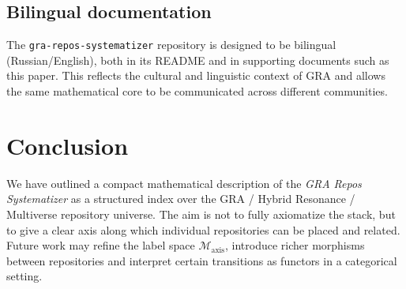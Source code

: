 \documentclass[11pt,a4paper]{article}
\begin{document}
\subsection{Bilingual documentation}

The \texttt{gra-repos-systematizer} repository is designed to be
bilingual (Russian/English), both in its README and in supporting
documents such as this paper.
This reflects the cultural and linguistic context of GRA and allows the
same mathematical core to be communicated across different communities.

\section{Conclusion}

We have outlined a compact mathematical description of the
\emph{GRA Repos Systematizer} as a structured index over the GRA /
Hybrid Resonance / Multiverse repository universe.
The aim is not to fully axiomatize the stack, but to give a clear axis
along which individual repositories can be placed and related.
Future work may refine the label space $\mathcal{M}_{\text{axis}}$,
introduce richer morphisms between repositories and interpret certain
transitions as functors in a categorical setting.
\end{document}
